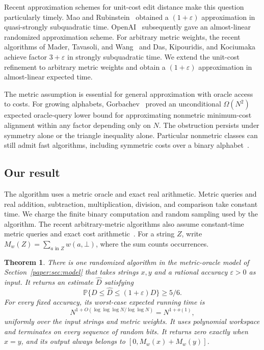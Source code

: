 \documentclass[11pt]{article}
\newtheorem{theorem}{Theorem}[section]
\theoremstyle{definition}
\newcommand{\Prb}{\mathbb P}
\newcommand{\gap}{\bot}
\newcommand{\1}{\mathbf 1}
\begin{document}
Recent approximation schemes for unit-cost edit distance make this
question particularly timely.
Mao and Rubinstein~\cite{MR26} obtained a $(1+\varepsilon)$ approximation
in quasi-strongly subquadratic time.
OpenAI~\cite{openai} subsequently gave an almost-linear randomized
approximation scheme.
For arbitrary metric weights, the recent algorithms of
Mader, Tavasoli, and Wang~\cite{mtw} and
Das, Kipouridis, and Kociumaka~\cite{dkk} achieve factor
$3+\varepsilon$ in strongly subquadratic time.
We extend the unit-cost refinement to arbitrary metric weights and
obtain a $(1+\varepsilon)$ approximation in almost-linear expected time.

The metric assumption is essential for general approximation with
oracle access to costs. For growing alphabets, Gorbachev~\cite{gor2026}
proved an unconditional $\Omega(N^2)$ expected oracle-query lower bound
for approximating nonmetric minimum-cost alignment within any factor
depending only on $N$. The obstruction persists under symmetry alone
or the triangle inequality alone. Particular nonmetric classes can
still admit fast algorithms, including symmetric costs over a binary
alphabet~\cite{gor2026}.

\subsection{Our result}

The algorithm uses a metric oracle and exact real arithmetic.
Metric queries and real addition, subtraction, multiplication, division,
and comparison take constant time. We charge the finite binary
computation and random sampling used by the algorithm.
The recent arbitrary-metric algorithms also assume constant-time
metric queries and exact cost arithmetic~\cite{mtw,dkk}.
For a string $Z$, write
$M_w(Z)=\sum_{a\text{ in }Z}w(a,\gap)$, where the sum counts occurrences.

\begin{theorem}\label{wrapper:thm:full}
There is one randomized algorithm in the metric-oracle model of
Section~\ref{paper:sec:model} that takes strings $x,y$ and a rational
accuracy $\varepsilon>0$ as input. It returns an estimate $\widehat D$
satisfying
\[
 \Prb\{D\le\widehat D\le(1+\varepsilon)D\}\ge5/6.
\]
For every fixed accuracy, its worst-case expected running time is
\[
 N^{1+O(\log\log\log N/\log\log N)}=N^{1+o(1)},
\]
uniformly over the input strings and metric weights.
It uses polynomial workspace and terminates on every sequence of random
bits. It returns zero exactly when $x=y$, and its output always belongs
to $[0,M_w(x)+M_w(y)]$.
\end{theorem}
\end{document}
